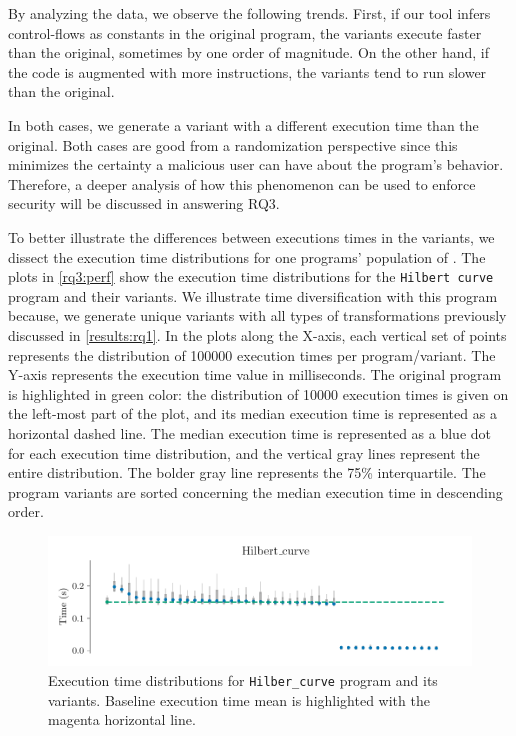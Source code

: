 By analyzing the data, we observe the following trends. First, if our tool infers control-flows as constants in the original program, the variants execute faster than the original, sometimes by one order of magnitude. On the other hand, if the code is augmented with more instructions, the variants tend to run slower than the original. 

In both cases, we generate a variant with a different execution time than the original. Both cases are good from a randomization perspective since this minimizes the certainty a malicious user can have about the program's behavior. Therefore, a deeper analysis of how this phenomenon can be used to enforce security will be discussed in answering RQ3.

To better illustrate the differences between executions times in the variants, we dissect the execution time distributions for one programs' population of \corpusrosetta. The plots in \autoref{rq3:perf} show the execution time distributions for the \texttt{Hilbert curve} program and their variants. 
We illustrate time diversification with this program because, we generate unique variants with all types of transformations previously discussed in \autoref{results:rq1}.
In the plots along the X-axis, each vertical set of points represents the distribution of 100000 execution times per program/variant. The Y-axis represents the execution time value in milliseconds. The original program is highlighted in green color: the distribution of 10000 execution times is given on the left-most part of the plot, and its median execution time is represented as a horizontal dashed line. The median execution time is represented as a blue dot for each execution time distribution, and the vertical gray lines represent the entire distribution. The bolder gray line represents the 75\% interquartile. The program variants are sorted concerning the median execution time in descending order.

\begin{figure}[h]
    \centering
    \includegraphics[width=\linewidth]{plots/hilbert_curve.pdf}
    \caption{Execution time distributions for \texttt{Hilber\_curve} program and its variants. Baseline execution time mean is highlighted with the magenta horizontal line. }
    \label{rq3:perf}
\end{figure}

